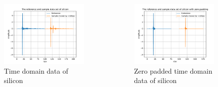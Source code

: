 \documentclass[aspectratio=1610, 9pt]{beamer}
\begin{document}
\begin{frame}
  \begin{center}
    \begin{columns}
      \begin{column}{0.5\textwidth}
        \begin{figure}
        \includegraphics[width=\textwidth]{silicon/THz_timedomain.pdf}
        \caption{Time domain data of silicon}
        \end{figure}
      \end{column}
      \begin{column}{0.5\textwidth}
        \begin{figure}
        \includegraphics[width=\textwidth]{silicon/THz_timedomain_zero.pdf}
        \caption{Zero padded time domain data of silicon}
        \end{figure}
      \end{column}
    \end{columns}
  \end{center}
\end{frame}
\end{document}
